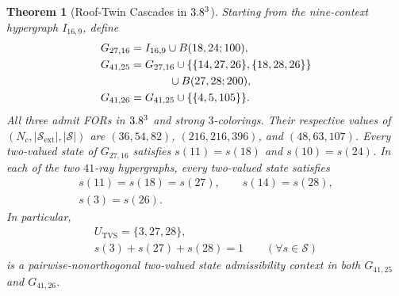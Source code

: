 \documentclass[aps,pra,reprint,superscriptaddress,longbibliography,nofootinbib,floatfix,10pt]{revtex4-2}
\newtheorem{theorem}{Theorem}
\theoremstyle{definition}\newtheorem{definition}[theorem]{Definition}
\theoremstyle{remark}\newtheorem{remark}[theorem]{Remark}
\newcommand{\Sc}{\mathcal S}\newcommand{\Cc}{\mathcal C}\newcommand{\Wc}{\mathcal W}
\begin{document}
\begin{theorem}[Roof-Twin Cascades in $3.8^3$]\label{thm:tvs-admissibility}
Starting from the nine-context hypergraph $I_{16,9}$, define
\begin{align*}
G_{27,16}&=I_{16,9}\cup B(18,24;100),\\
G_{41,25}&=G_{27,16}\cup\{\{14,27,26\},\{18,28,26\}\}\\
&\hspace{3.5em}\cup B(27,28;200),\\
G_{41,26}&=G_{41,25}\cup\{\{4,5,105\}\}.
\end{align*}
All three admit FORs in $3.8^3$ and strong $3$-colorings. Their respective values of $(N_c,|\Sc_{\mathrm{ext}}|,|\Sc|)$ are
$(36,54,82)$, $(216,216,396)$, and $(48,63,107)$.
Every two-valued state of $G_{27,16}$ satisfies $s(11)=s(18)$ and $s(10)=s(24)$. In each of the two $41$-ray hypergraphs, every two-valued state satisfies
\begin{equation}\label{eq:G41-twins}
\begin{gathered}
s(11)=s(18)=s(27),\qquad s(14)=s(28),\\
s(3)=s(26).
\end{gathered}
\end{equation}
In particular,
\begin{equation}\label{eq:U-TVS}
\begin{gathered}
U_{\mathrm{TVS}}=\{3,27,28\},\\
s(3)+s(27)+s(28)=1\qquad(\forall s\in\Sc)
\end{gathered}
\end{equation}
is a pairwise-nonorthogonal two-valued state admissibility context in both $G_{41,25}$ and $G_{41,26}$.
\end{theorem}
\end{document}

